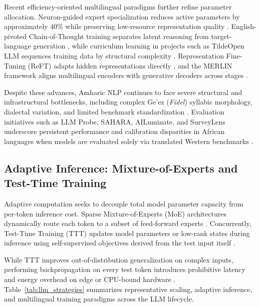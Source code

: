 \documentclass{interact}
\begin{document}
Recent efficiency-oriented multilingual paradigms further refine parameter allocation. Neuron-guided expert specialization reduces active parameters by approximately 40\% while preserving low-resource representation quality \cite{ref40}. English-pivoted Chain-of-Thought training separates latent reasoning from target-language generation \cite{ref41}, while curriculum learning in projects such as TildeOpen LLM sequences training data by structural complexity \cite{ref42}. Representation Fine-Tuning (ReFT) adapts hidden representations directly \cite{ref43}, and the MERLIN framework aligns multilingual encoders with generative decoders across stages \cite{ref44}.

Despite these advances, Amharic NLP continues to face severe structural and infrastructural bottlenecks, including complex Ge'ez (\textit{Fidel}) syllabic morphology, dialectal variation, and limited benchmark standardization \cite{ref21}. Evaluation initiatives such as LLM Probe, SAHARA, AILuminate, and SurveyLens underscore persistent performance and calibration disparities in African languages when models are evaluated solely via translated Western benchmarks \cite{ref46,ref51,ref52,ref53}.

\subsection{Adaptive Inference: Mixture-of-Experts and Test-Time Training}

Adaptive computation seeks to decouple total model parameter capacity from per-token inference cost. Sparse Mixture-of-Experts (MoE) architectures dynamically route each token to a subset of feed-forward experts \cite{ref20}. Concurrently, Test-Time Training (TTT) updates model parameters or low-rank states during inference using self-supervised objectives derived from the test input itself \cite{ref35,ref36}.

While TTT improves out-of-distribution generalization on complex inputs, performing backpropagation on every test token introduces prohibitive latency and energy overhead on edge or CPU-bound hardware \cite{ref37}. Table~\ref{tab:llm_strategies} summarizes representative scaling, adaptive inference, and multilingual training paradigms across the LLM lifecycle.
\end{document}
